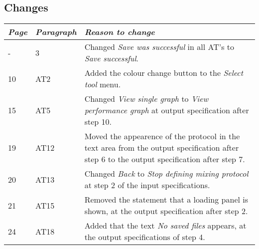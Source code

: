 \subsection*{Changes}
\begin{tabular}{lll}
    \toprule
    \emph{Page} & \emph{Paragraph} & \emph{Reason to change} \\
    \midrule
    - & 3 & Changed \emph{Save was successful} in all AT's to \emph{Save successful}. \\
    10 & AT2 & Added the colour change button to the \emph{Select tool} menu. \\
    15 & AT5 & Changed \emph{View single graph} to \emph{View performance graph} at output specification after step 10. \\
    19 & AT12 & Moved the appearence of the protocol in the text area from the output specification after step 6 to the output specification after step 7. \\
    20 & AT13 & Changed \emph{Back} to \emph{Stop defining mixing protocol} at step 2 of the input specifications. \\
    21 & AT15 & Removed the statement that a loading panel is shown, at the output specification after step 2. \\
    24 & AT18 & Added that the text \emph{No saved files} appears, at the output specifications of step 4. \\
    \bottomrule
\end{tabular}
